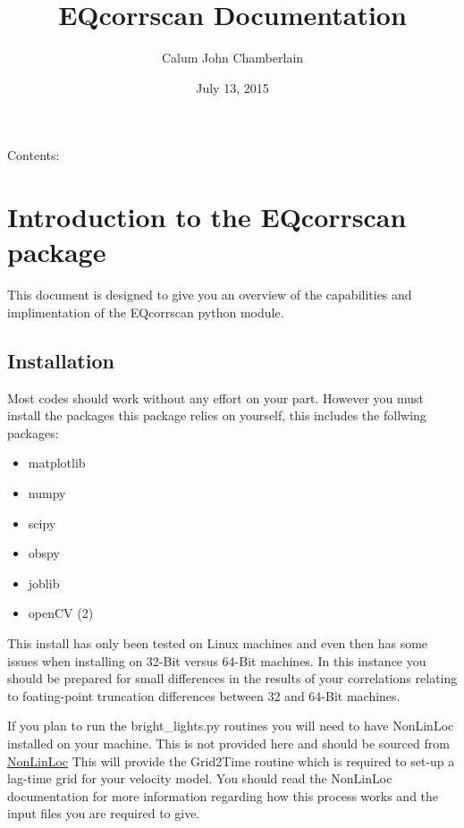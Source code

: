 \documentclass[a4paper,10pt,english]{sphinxmanual}
\title{EQcorrscan Documentation}
\date{July 13, 2015}
\author{Calum John Chamberlain}
\begin{document}
\maketitle
\tableofcontents
{}\label{index::doc}


Contents:


\chapter{Introduction to the EQcorrscan package}
\label{intro::doc}\label{intro:introduction-to-the-eqcorrscan-package}\label{intro:welcome-to-eqcorrscan-s-documentation}
This document is designed to give you an overview of the capabilities and
implimentation of the EQcorrscan python module.


\section{Installation}
\label{intro:installation}
Most codes should work without any effort on your part.  However you must
install the packages this package relies on yourself, this includes the follwing
packages:
\begin{itemize}
\item {} 
matplotlib

\item {} 
numpy

\item {} 
scipy

\item {} 
obspy

\item {} 
joblib

\item {} 
openCV (2)

\end{itemize}

This install has only been tested on Linux machines and even then has some
issues when installing on 32-Bit versus 64-Bit machines.  In this instance you
should be prepared for small differences in the results of your correlations
relating to foating-point truncation differences between 32 and 64-Bit
machines.

If you plan to run the bright\_lights.py routines you will need to have
NonLinLoc installed on your machine.  This is not provided here and should
be sourced from \href{http://alomax.free.fr/nlloc/}{NonLinLoc} This will provide
the Grid2Time routine which is required to set-up a lag-time grid for your
velocity model.  You should read the NonLinLoc documentation for more
information regarding how this process works and the input files you are
required to give.
\end{document}
